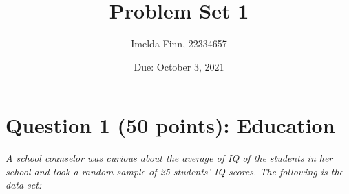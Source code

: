 \documentclass[12pt,letterpaper]{article}
\title{Problem Set 1}
\date{Due: October 3, 2021}
\author{Imelda Finn, 22334657}
\begin{document}
	\maketitle

	\vspace{1cm}
	\section*{Question 1 (50 points): Education}
	
	\emph{A school counselor was curious about the average of IQ of the students in her school and took a random sample of 25 students' IQ scores. The following is the data set:}\\
	\vspace{.5cm}
	
	  
	
	\vspace{.5cm}
	
\end{document}
